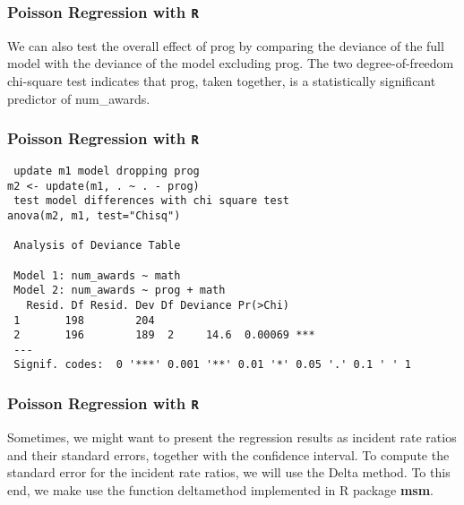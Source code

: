 \documentclass[00-GLMregslides.tex]{subfiles}
\begin{document}
\begin{frame}[fragile]

\frametitle{Poisson Regression with \texttt{R}}
\Large 
We can also test the overall effect of prog by comparing the deviance of the full model with the deviance of the model excluding prog. The two degree-of-freedom chi-square test indicates that prog, taken together, is a statistically significant predictor of num\_awards.
 

\end{frame}

\begin{frame}[fragile]

\frametitle{Poisson Regression with \texttt{R}}
\Large

\begin{framed}
\begin{verbatim}
 update m1 model dropping prog
m2 <- update(m1, . ~ . - prog)
 test model differences with chi square test
anova(m2, m1, test="Chisq")
 
 Analysis of Deviance Table
 
 Model 1: num_awards ~ math
 Model 2: num_awards ~ prog + math
   Resid. Df Resid. Dev Df Deviance Pr(>Chi)    
 1       198        204                         
 2       196        189  2     14.6  0.00069 ***
 ---
 Signif. codes:  0 '***' 0.001 '**' 0.01 '*' 0.05 '.' 0.1 ' ' 1
\end{verbatim}
\end{framed}
\end{frame}

\begin{frame}[fragile]

\frametitle{Poisson Regression with \texttt{R}}
\Large 
Sometimes, we might want to present the regression results as incident rate ratios and their standard errors, together with the confidence interval. To compute the standard error for the incident rate ratios, we will use the Delta method. To this end, we make use the function deltamethod implemented in R package \textbf{msm}.

\end{frame}
\end{document}
